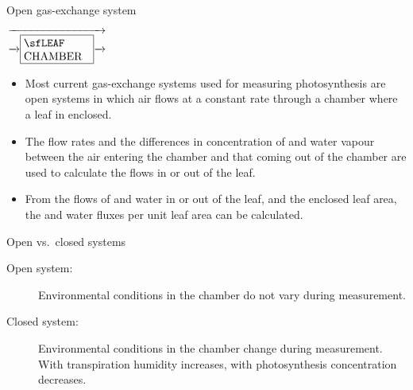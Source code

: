 \documentclass[10pt]{beamer}\usepackage[]{graphicx}\usepackage[]{color}
\begin{document}
\begin{frame}{Open gas-exchange system}
\begin{footnotesize}
\begin{center}
%
$\makebox[3.1cm]{\rightarrowfill} \atop
\makebox[3.1cm]{%
\rightarrowfill
\fbox{\parbox{2.1cm}{\sf%
LEAF CHAMBER}}%
\rightarrowfill}$
%
\end{center}
\end{footnotesize}
    \begin{itemize}
        \item Most current gas-exchange systems used for measuring photosynthesis
        are open systems in which air flows at a constant rate through a chamber
        where a leaf in enclosed.

        \item The flow rates and the differences in concentration of \COtwo and
        water vapour between the air entering the chamber and that coming
        out of the chamber are used to calculate the flows in or out of the leaf.

        \item From the flows of \COtwo and water in or out of the leaf, and the enclosed leaf area, the
        \COtwo and water fluxes per unit leaf area can be calculated.
    \end{itemize}
\end{frame}

\begin{frame}{Open vs.\ closed systems}
    \begin{description}
        \item[Open system:] Environmental conditions in the chamber do not
        vary during measurement.
        \item[Closed system:] Environmental conditions in the chamber change during measurement.
        With transpiration humidity increases, with photosynthesis \COtwo
        concentration decreases.
    \end{description}
\end{frame}
\end{document}
